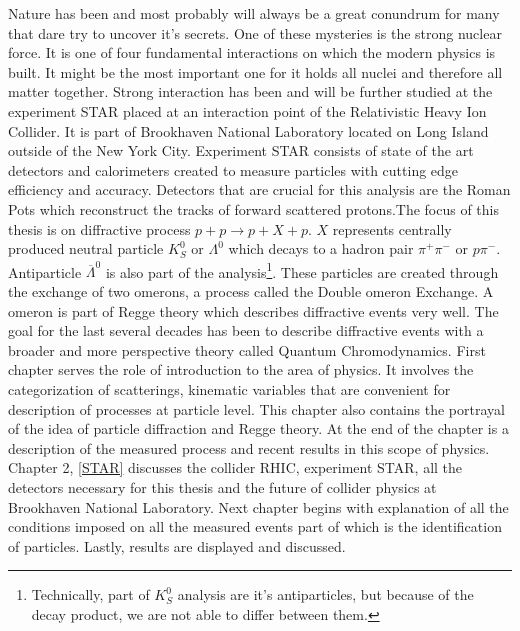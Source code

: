 
Nature has been and most probably will always be a great conundrum for many that dare try to uncover it's secrets. One of these mysteries is the strong nuclear force. It is one of four fundamental interactions on which the modern physics is built. It might be the most important one for it holds all nuclei and therefore all matter together. 
\newline
Strong interaction has been and will be further studied at the experiment STAR placed at an interaction point of the Relativistic Heavy Ion Collider. It is part of Brookhaven National Laboratory located on Long Island outside of the New York City. Experiment STAR consists of state of the art detectors and calorimeters created to measure particles with cutting edge efficiency and accuracy. Detectors that are crucial for this analysis are the Roman Pots which reconstruct the tracks of forward scattered protons.The focus of this thesis is on diffractive process $p+p \longrightarrow p + X + p$. $X$ represents centrally produced neutral particle $K^0_S$ or $\Lambda^0$ which decays to a hadron pair $\pi^+ \pi^-$ or $p \pi^-$. Antiparticle $\overline{\Lambda}^0$ is also part of the analysis\footnote{Technically, part of $K^0_S$ analysis are it's antiparticles, but because of the decay product, we are not able to differ between them.}. These particles are created through the exchange of two \Pom omerons, a process called the Double \Pom omeron Exchange. A \Pom omeron is part of Regge theory which describes diffractive events very well. The goal for the last several decades has been to describe diffractive events with a broader and more perspective theory called Quantum Chromodynamics. 
\newline
First chapter serves the role of introduction to the area of physics. It involves the categorization of scatterings, kinematic variables that are convenient for description of processes at particle level. This chapter also contains the portrayal of the idea of particle diffraction and Regge theory. At the end of the chapter is a description of the measured process and recent results in this scope of physics. Chapter 2, \autoref{STAR} discusses the collider RHIC, experiment STAR, all the detectors necessary for this thesis and the future of collider physics at Brookhaven National Laboratory. Next chapter begins with explanation of all the conditions imposed on all the measured events part of which is the identification of particles. Lastly, results are displayed and discussed. 
